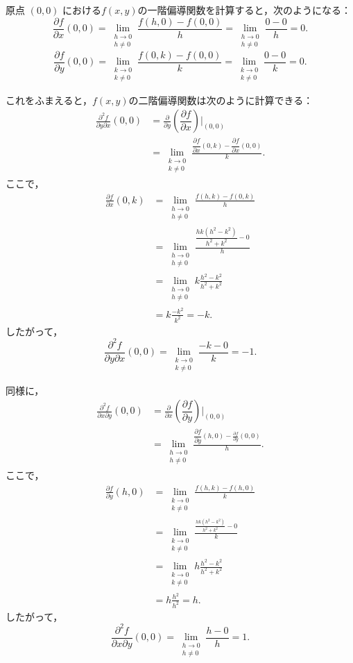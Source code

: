 \begin{tanswer}
原点 $(0,0)$ における$f(x,y)$の一階偏導関数を計算すると，次のようになる：
\[
\frac{\partial f}{\partial x}(0,0) = \lim_{\substack{h \to 0 \\ h \ne 0}}\frac{f(h,0)-f(0,0)}{h} = \lim_{\substack{h \to 0 \\ h \ne 0}}\frac{0-0}{h} = 0.
\]
\[
\frac{\partial f}{\partial y}(0,0) = \lim_{\substack{k \to 0 \\ k \ne 0}}\frac{f(0,k)-f(0,0)}{k} = \lim_{\substack{k \to 0 \\ k \ne 0}}\frac{0-0}{k} = 0.
\]

これをふまえると，$f(x,y)$の二階偏導関数は次のように計算できる：
\begin{align*}
\frac{\partial^2 f}{\partial y \partial x}(0,0) &= \frac{\partial}{\partial y}\left(\dfrac{\partial f}{\partial x}\right)\Biggr|_{(0,0)}\\
&= \lim_{\substack{k \to 0 \\ k \ne 0}}\frac{\dfrac{\partial f}{\partial x}(0,k) - \dfrac{\partial f}{\partial x}(0,0)}{k}.
\end{align*}
ここで，
\begin{align*}
\frac{\partial f}{\partial x}(0,k) &= \lim_{\substack{h \to 0 \\ h \ne 0}}\frac{f(h,k) - f(0,k)}{h} \\
&= \lim_{\substack{h \to 0 \\ h \ne 0}}\frac{\dfrac{hk(h^2-k^2)}{h^2+k^2} - 0}{h} \\
&= \lim_{\substack{h \to 0 \\ h \ne 0}} k \frac{h^2-k^2}{h^2+k^2} \\
&= k \frac{-k^2}{k^2} = -k.
\end{align*}
したがって，
\[
\frac{\partial^2 f}{\partial y \partial x}(0,0) = \lim_{\substack{k \to 0 \\ k \ne 0}}\frac{-k - 0}{k} = -1.
\]

同様に，
\begin{align*}
\frac{\partial^2 f}{\partial x \partial y}(0,0) &= \frac{\partial}{\partial x}\left(\dfrac{\partial f}{\partial y}\right)\Biggr|_{(0,0)} \\
&= \lim_{\substack{h \to 0 \\ h \ne 0}}\frac{\dfrac{\partial f}{\partial y}(h,0) - \frac{\partial f}{\partial y}(0,0)}{h}.
\end{align*}
ここで，
\begin{align*}
\frac{\partial f}{\partial y}(h,0) &= \lim_{\substack{k \to 0 \\ k \ne 0}}\frac{f(h,k) - f(h,0)}{k} \\
&= \lim_{\substack{k \to 0 \\ k \ne 0}}\frac{\frac{hk(h^2-k^2)}{h^2+k^2} - 0}{k} \\
&= \lim_{\substack{k \to 0 \\ k \ne 0}} h \frac{h^2-k^2}{h^2+k^2} \\
&= h \frac{h^2}{h^2} = h.
\end{align*}
したがって，
\[
\frac{\partial^2 f}{\partial x \partial y}(0,0) = \lim_{\substack{h \to 0 \\ h \ne 0}}\frac{h - 0}{h} = 1.
\]


\end{tanswer}
